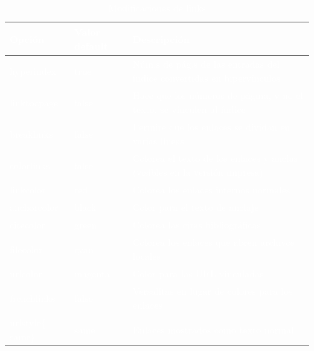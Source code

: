 \documentclass[12pt,letterpaper]{article}
\begin{document}
\begin{table}[h]
    \caption{\textcolor{white}{Modificaciones de links}}
    \label{tabl mods links}
    \centering
    \begin{tabular}{|l|l|l|}\hline
        \textcolor{white}{\textbf{Opción}} & \textcolor{white}{\textbf{Valor default}} & \textcolor{white}{\textbf{Descripción}}\\\hline
        \textcolor{white}{hyperindex} & \textcolor{white}{true} & \textcolor{white}{Núm.s de pág.s de las entradas del índice convertidas en hipervínculos}\\\hline
        \textcolor{white}{linktocpage} & \textcolor{white}{false} & \textcolor{white}{Hace que los números de página, y no el texto, se vinculen al índice}\\\hline
        \textcolor{white}{breaklinks} & \textcolor{white}{false} & \textcolor{white}{Permite que los enlaces se dividan en varias líneas}\\\hline
        \textcolor{white}{colorlinks} & \textcolor{white}{false} & \textcolor{white}{Colorea el texto de los enlaces y anclas (visibles en la versión impresa)}\\\hline
        \textcolor{white}{linkcolor} & \textcolor{white}{red} & \textcolor{white}{Colorea los enlaces internos normales}\\\hline
        \textcolor{white}{anchorcolor} & \textcolor{white}{black}	& \textcolor{white}{Color para el texto de anclaje}\\\hline
        \textcolor{white}{citecolor} & \textcolor{white}{green} & \textcolor{white}{Colorea las citas bibliográficas}\\\hline
        \textcolor{white}{filecolor} & \textcolor{white}{cyan} & \textcolor{white}{Colorea los enlaces que abren archivos locales}\\\hline
        \textcolor{white}{urlcolor} & \textcolor{white}{magenta} & \textcolor{white}{Color para las URL vinculadas}\\\hline
        \textcolor{white}{frenchlinks} & \textcolor{white}{false} & \textcolor{white}{Versalitas en lugar de colores para los enlaces}\\\hline
        \textcolor{white}{urlstyle$\{$same$\}$} & \textcolor{white}{same} & \textcolor{white}{Enlaces mostrados como texto normal}\\\hline
    \end{tabular}
\end{table}
\end{document}
